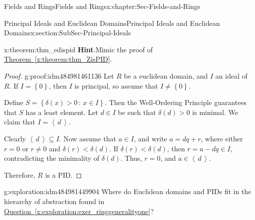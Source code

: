 \documentclass[oneside,10pt,]{book}
\newcommand{\blocktitlefont}{\relax}
\newcommand{\xreffont}{\relax}
\numberwithin{equation}{section}
\newcommand{\ideal}[1]{\left\langle\, #1 \,\right\rangle}
\newcommand{\set}[1]{\left\{ {#1} \right\}}
\newcommand{\setof}[2]{{\left\{#1\,\colon\,#2\right\}}}
\newcommand{\lt}{<}
\begin{document}
\begin{chapterptx}{Fields and Rings}{}{Fields and Rings}{}{}{x:chapter:Sec-Fields-and-Rings}
\begin{sectionptx}{Principal Ideals and Euclidean Domains}{}{Principal Ideals and Euclidean Domains}{}{}{x:section:SubSec-Principal-Ideals}
\begin{theorem}{}{}{x:theorem:thm_edispid}
\textbf{\blocktitlefont Hint}.\quad{}Mimic the proof of \hyperref[x:theorem:thm_ZisPID]{Theorem~{\xreffont\ref{x:theorem:thm_ZisPID}}}.%
\end{theorem}
\begin{proof}{}{g:proof:idm484981461136}
Let \(R\) be a euclidean domain, and \(I\) an ideal of \(R\). If \(I = \set{0}\), then \(I\) is principal, so assume that \(I\ne \set{0}\).%
\par
Define \(S = \setof{\delta(x)>0}{x\in I}\). Then the Well-Ordering Principle guarantees that \(S\) has a least element. Let \(d\in I\) be such that \(\delta(d) > 0\) is minimal. We claim that \(I = \ideal{d}\).%
\par
Clearly \(\ideal{d}\subseteq I\). Now assume that \(a\in I\), and write \(a = dq + r\), where either \(r = 0\) or \(r\ne 0\) and \(\delta(r) \lt \delta(d)\). If \(\delta(r) \lt \delta(d)\), then \(r = a - dq \in I\), contradicting the minimality of \(\delta(d)\). Thus, \(r = 0\), and \(a\in \ideal{d}\).%
\par
Therefore, \(R\) is a PID.%
\end{proof}
\begin{exploration}{}{g:exploration:idm484981449904}%
Where do Euclidean domains and PIDs fit in the hierarchy of abstraction found in \hyperref[x:exploration:exer_ringgeneralityone]{Question~{\xreffont\ref{x:exploration:exer_ringgeneralityone}}}?%
\end{exploration}
\end{sectionptx}
\end{chapterptx}
%
%
\typeout{************************************************}
\typeout{************************************************}
%
\end{document}
